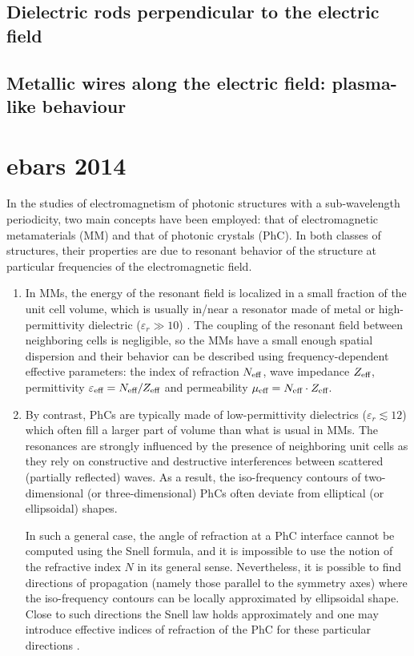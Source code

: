 \documentclass[letterpaper,12pt]{report}
\begin{document}
\section{Dielectric rods perpendicular to the electric field}






\section{Metallic wires along the electric field: plasma-like behaviour}




\chapter{ebars 2014}
In the studies of electromagnetism of photonic structures with a sub-wavelength
periodicity, two main concepts have been employed: that of electromagnetic metamaterials
(MM) and that of photonic crystals (PhC). In both classes of structures, their properties
are due to resonant behavior of the structure at particular frequencies of the
electromagnetic field.
\begin{enumerate}
\item {
In MMs, the energy of the resonant field is localized in a small fraction of the unit
cell volume, which is usually in/near a resonator made of metal or high-permittivity
dielectric ($\varepsilon_r \gg 10$) \cite{vendik2012tunable}. 
The coupling of the resonant field between
neighboring cells is negligible, so the MMs have a small enough spatial dispersion and
their behavior can be described using frequency-dependent effective parameters: the index
of refraction $N_{\text{eff} }$, wave impedance $Z_{\text{eff} }$, permittivity $\varepsilon_{\text{eff} }=N_{\text{eff} }/Z_{\text{eff} }$ and
permeability $\mu_{\text{eff} } = N_{\text{eff} }\cdot Z_{\text{eff} }$.
}
\item{
By contrast, PhCs are typically made of low-permittivity dielectrics ($\varepsilon_r
\lesssim 12$) which often fill a larger part of volume than what is usual in MMs. The
resonances are strongly influenced by the presence of neighboring unit cells as they rely
on constructive and destructive interferences between scattered (partially reflected)
waves. As a result, the iso-frequency contours of two-dimensional (or three-dimensional)
PhCs often deviate from elliptical (or ellipsoidal) shapes.

In such a general case, the angle of refraction at a PhC interface cannot be computed
using the Snell formula, and it is impossible to use the notion of the
refractive index $N$ in its general sense. Nevertheless, it is possible to find directions of
propagation (namely those parallel to the symmetry axes) where the iso-frequency contours
can be locally approximated by ellipsoidal shape. Close to such directions the
Snell law holds approximately and one may introduce effective indices of
refraction of the PhC for these particular directions \cite{yannopapas2005negative}.
}
\end{enumerate}
\end{document}
